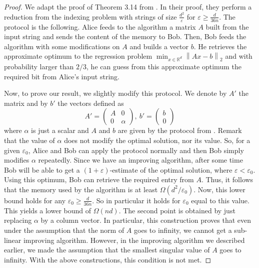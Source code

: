 \documentclass[a4paper,11pt,oneside,english,onecolumn]{article}
\theoremstyle{definition}
\newcommand{\norm}[1]{\ensuremath{\left\| #1\right\|_2}}
\newcommand{\REAL}{\ensuremath{\mathbb{R}}}
\newcommand{\eps}{\ensuremath{\varepsilon}}
\begin{document}
\begin{proof}
We adapt the proof of Theorem 3.14 from \cite{LinAlgStream}. In their proof, they perform a reduction from the indexing problem with strings of size $\frac{d^2}{\eps}$ for $\eps \geq \frac{d}{36n}$. The protocol is the following. Alice feeds to the algorithm a matrix $A$ built from the input string and sends the content of the memory to Bob. Then, Bob feeds the algorithm with some modifications on $A$ and builds a vector $b$.
He retrieves the approximate optimum to the regression problem $\min_{x \in \REAL ^d}\norm{Ax-b}$ and with probability larger than $2/3$, he can guess from this approximate optimum the required bit from Alice's input string.

Now, to prove our result, we slightly modify this protocol. We denote by $A'$ the matrix and by $b'$ the vectors defined as 
$$
A' = \begin{pmatrix}
A & 0 \\ 
0 & \alpha
\end{pmatrix} 
, \ b' = \begin{pmatrix}
b \\ 0
\end{pmatrix}
$$
where $\alpha$ is just a scalar and $A$ and $b$ are given by the protocol from \cite{LinAlgStream}. Remark that the value of $\alpha$ does not modify the optimal solution, nor its value. So, for a given $\eps_0$, Alice and Bob can apply the protocol normally and then Bob simply modifies $\alpha$ repeatedly. Since we have an improving algorithm, after some time Bob will be able to get a $(1 + \eps)$-estimate of the optimal solution, where $\eps < \eps_0$. Using this optimum, Bob can retrieve the required entry from $A$. Thus, it follows that the memory used by the algorithm is at least $\Omega(d^2/\eps_0)$. Now, this lower bound holds for any $\eps_0 \geq \frac{d}{36n}$. So in particular it holds for $\eps_0$ equal to this value. This yields a lower bound of $\Omega(nd)$. The second point is obtained by just replacing $\alpha$ by a column vector. In particular, this construction proves that even under the assumption that the norm of $A$ goes to infinity, we cannot get a sub-linear improving algorithm. However, in the improving algorithm we described earlier, we made the assumption that the smallest singular value of $A$ goes to infinity. With the above constructions, this condition is not met.


\end{proof}
\end{document}
